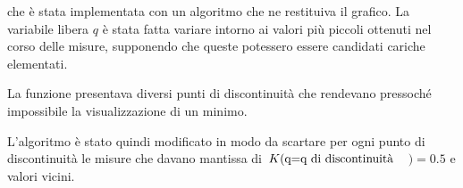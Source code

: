 \documentclass{article}
\begin{document}
    che è stata implementata con un algoritmo che ne restituiva il grafico. La variabile libera $q$ è stata fatta variare intorno ai valori più piccoli ottenuti nel corso delle misure, supponendo che queste potessero essere candidati cariche elementati.

    \begin{figure}[H]\label{Histo:100 data}
    \centering
        \qquad 
        
    \end{figure}
    
    La funzione presentava diversi punti di discontinuità che rendevano pressoché impossibile la visualizzazione di un minimo.
    
    L'algoritmo è stato quindi modificato in modo da scartare per ogni punto di discontinuità le misure che davano mantissa di $K(\qq*{q=q di discontinuità}$$)=0.5$ e valori vicini.
    
\end{document}

